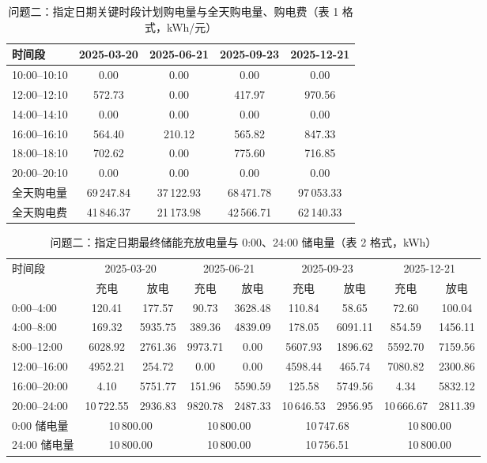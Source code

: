 \begin{table}[htbp]
\centering
\caption{问题二\nobreak：指定日期关键时段计划购电量与全天购电量\nobreak、购电费（表 1 格式\nobreak，kWh/元\nobreak）}
\label{tab:q2t1}
\begin{tabular}{@{}lcccc@{}}
\toprule
时间段 & 2025-03-20 & 2025-06-21 & 2025-09-23 & 2025-12-21 \\
\midrule
10:00--10:10 & 0.00 & 0.00 & 0.00 & 0.00 \\
12:00--12:10 & 572.73 & 0.00 & 417.97 & 970.56 \\
14:00--14:10 & 0.00 & 0.00 & 0.00 & 0.00 \\
16:00--16:10 & 564.40 & 210.12 & 565.82 & 847.33 \\
18:00--18:10 & 702.62 & 0.00 & 775.60 & 716.85 \\
20:00--20:10 & 0.00 & 0.00 & 0.00 & 0.00 \\
\midrule
全天购电量 & 69\,247.84 & 37\,122.93 & 68\,471.78 & 97\,053.33 \\
全天购电费 & 41\,846.37 & 21\,173.98 & 42\,566.71 & 62\,140.33 \\
\bottomrule
\end{tabular}
\end{table}

\begin{table}[htbp]
\centering
\caption{问题二\nobreak：指定日期最终储能充放电量与 0:00\nobreak、24:00 储电量（表 2 格式\nobreak，kWh\nobreak）}
\label{tab:q2t2}
\begin{tabular}{@{}lcccccccc@{}}
\toprule
\multirow{2}{*}{时间段} & \multicolumn{2}{c}{2025-03-20} & \multicolumn{2}{c}{2025-06-21} &
\multicolumn{2}{c}{2025-09-23} & \multicolumn{2}{c}{2025-12-21} \\
\cmidrule(lr){2-3}\cmidrule(lr){4-5}\cmidrule(lr){6-7}\cmidrule(lr){8-9}
& 充电 & 放电 & 充电 & 放电 & 充电 & 放电 & 充电 & 放电 \\
\midrule
0:00--4:00 & 120.41 & 177.57 & 90.73 & 3628.48 & 110.84 & 58.65 & 72.60 & 100.04 \\
4:00--8:00 & 169.32 & 5935.75 & 389.36 & 4839.09 & 178.05 & 6091.11 & 854.59 & 1456.11 \\
8:00--12:00 & 6028.92 & 2761.36 & 9973.71 & 0.00 & 5607.93 & 1896.62 & 5592.70 & 7159.56 \\
12:00--16:00 & 4952.21 & 254.72 & 0.00 & 0.00 & 4598.44 & 465.74 & 7080.82 & 2300.86 \\
16:00--20:00 & 4.10 & 5751.77 & 151.96 & 5590.59 & 125.58 & 5749.56 & 4.34 & 5832.12 \\
20:00--24:00 & 10\,722.55 & 2936.83 & 9820.78 & 2487.33 & 10\,646.53 & 2956.95 & 10\,666.67 & 2811.39 \\
\midrule
0:00 储电量 & \multicolumn{2}{c}{10\,800.00} & \multicolumn{2}{c}{10\,800.00} &
\multicolumn{2}{c}{10\,747.68} & \multicolumn{2}{c}{10\,800.00} \\
24:00 储电量 & \multicolumn{2}{c}{10\,800.00} & \multicolumn{2}{c}{10\,800.00} &
\multicolumn{2}{c}{10\,756.51} & \multicolumn{2}{c}{10\,800.00} \\
\bottomrule
\end{tabular}
\end{table}

